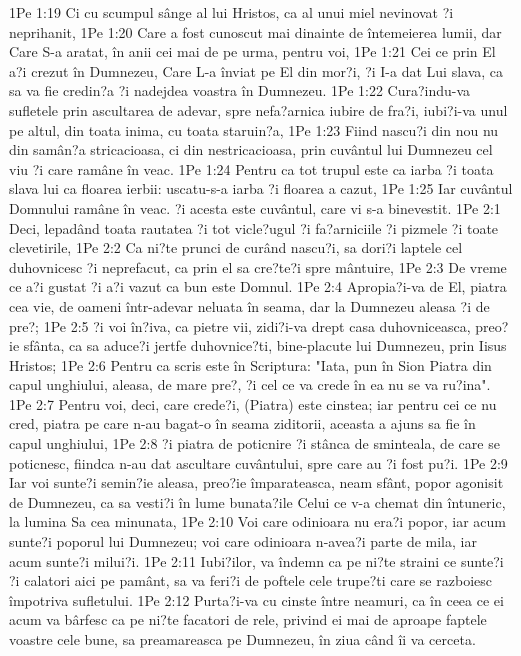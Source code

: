 1Pe 1:19  Ci cu scumpul sânge al lui Hristos, ca al unui miel nevinovat ?i neprihanit,
1Pe 1:20  Care a fost cunoscut mai dinainte de întemeierea lumii, dar Care S-a aratat, în anii cei mai de pe urma, pentru voi,
1Pe 1:21  Cei ce prin El a?i crezut în Dumnezeu, Care L-a înviat pe El din mor?i, ?i I-a dat Lui slava, ca sa va fie credin?a ?i nadejdea voastra în Dumnezeu.
1Pe 1:22  Cura?indu-va sufletele prin ascultarea de adevar, spre nefa?arnica iubire de fra?i, iubi?i-va unul pe altul, din toata inima, cu toata staruin?a,
1Pe 1:23  Fiind nascu?i din nou nu din samân?a stricacioasa, ci din nestricacioasa, prin cuvântul lui Dumnezeu cel viu ?i care ramâne în veac.
1Pe 1:24  Pentru ca tot trupul este ca iarba ?i toata slava lui ca floarea ierbii: uscatu-s-a iarba ?i floarea a cazut,
1Pe 1:25  Iar cuvântul Domnului ramâne în veac. ?i acesta este cuvântul, care vi s-a binevestit.
1Pe 2:1  Deci, lepadând toata rautatea ?i tot vicle?ugul ?i fa?arniciile ?i pizmele ?i toate clevetirile,
1Pe 2:2  Ca ni?te prunci de curând nascu?i, sa dori?i laptele cel duhovnicesc ?i neprefacut, ca prin el sa cre?te?i spre mântuire,
1Pe 2:3  De vreme ce a?i gustat ?i a?i vazut ca bun este Domnul.
1Pe 2:4  Apropia?i-va de El, piatra cea vie, de oameni într-adevar neluata în seama, dar la Dumnezeu aleasa ?i de pre?;
1Pe 2:5  ?i voi în?iva, ca pietre vii, zidi?i-va drept casa duhovniceasca, preo?ie sfânta, ca sa aduce?i jertfe duhovnice?ti, bine-placute lui Dumnezeu, prin Iisus Hristos;
1Pe 2:6  Pentru ca scris este în Scriptura: "Iata, pun în Sion Piatra din capul unghiului, aleasa, de mare pre?, ?i cel ce va crede în ea nu se va ru?ina".
1Pe 2:7  Pentru voi, deci, care crede?i, (Piatra) este cinstea; iar pentru cei ce nu cred, piatra pe care n-au bagat-o în seama ziditorii, aceasta a ajuns sa fie în capul unghiului,
1Pe 2:8  ?i piatra de poticnire ?i stânca de sminteala, de care se poticnesc, fiindca n-au dat ascultare cuvântului, spre care au ?i fost pu?i.
1Pe 2:9  Iar voi sunte?i semin?ie aleasa, preo?ie împarateasca, neam sfânt, popor agonisit de Dumnezeu, ca sa vesti?i în lume bunata?ile Celui ce v-a chemat din întuneric, la lumina Sa cea minunata,
1Pe 2:10  Voi care odinioara nu era?i popor, iar acum sunte?i poporul lui Dumnezeu; voi care odinioara n-avea?i parte de mila, iar acum sunte?i milui?i.
1Pe 2:11  Iubi?ilor, va îndemn ca pe ni?te straini ce sunte?i ?i calatori aici pe pamânt, sa va feri?i de poftele cele trupe?ti care se razboiesc împotriva sufletului.
1Pe 2:12  Purta?i-va cu cinste între neamuri, ca în ceea ce ei acum va bârfesc ca pe ni?te facatori de rele, privind ei mai de aproape faptele voastre cele bune, sa preamareasca pe Dumnezeu, în ziua când îi va cerceta.
